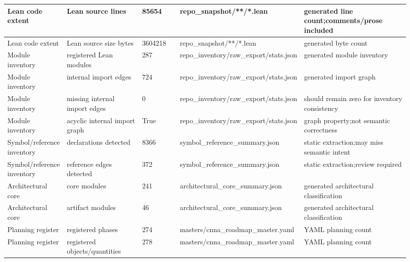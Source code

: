 \begin{longtable}{L{0.13\linewidth} L{0.205\linewidth} L{0.1\linewidth} L{0.235\linewidth} L{0.285\linewidth}}
\hline
\addlinespace[0.24em]
Lean code extent & Lean source lines & 85654 & repo\_snapshot/\allowbreak{}**/\allowbreak{}*.lean & generated line count;\newline comments/\allowbreak{}prose included\\
\hline
\addlinespace[0.24em]
Lean code extent & Lean source size bytes & 3604218 & repo\_snapshot/\allowbreak{}**/\allowbreak{}*.lean & generated byte count\\
\hline
\addlinespace[0.24em]
Module inventory & registered Lean modules & 287 & repo\_inventory/\allowbreak{}raw\_export/\allowbreak{}stats.json & generated module inventory\\
\hline
\addlinespace[0.24em]
Module inventory & internal import edges & 724 & repo\_inventory/\allowbreak{}raw\_export/\allowbreak{}stats.json & generated import graph\\
\hline
\addlinespace[0.24em]
Module inventory & missing internal import edges & 0 & repo\_inventory/\allowbreak{}raw\_export/\allowbreak{}stats.json & should remain zero for inventory consistency\\
\hline
\addlinespace[0.24em]
Module inventory & acyclic internal import graph & True & repo\_inventory/\allowbreak{}raw\_export/\allowbreak{}stats.json & graph property;\newline not semantic correctness\\
\hline
\addlinespace[0.24em]
Symbol/\allowbreak{}reference inventory & declarations detected & 8366 & symbol\_reference\_summary.json & static extraction;\newline may miss semantic intent\\
\hline
\addlinespace[0.24em]
Symbol/\allowbreak{}reference inventory & reference edges detected & 372 & symbol\_reference\_summary.json & static extraction;\newline review required\\
\hline
\addlinespace[0.24em]
Architectural core & core modules & 241 & architectural\_core\_summary.json & generated architectural classification\\
\hline
\addlinespace[0.24em]
Architectural core & artifact modules & 46 & architectural\_core\_summary.json & generated architectural classification\\
\hline
\addlinespace[0.24em]
Planning register & registered phases & 274 & masters/\allowbreak{}cnna\_roadmap\_master.yaml & YAML planning count\\
\hline
\addlinespace[0.24em]
Planning register & registered objects/\allowbreak{}quantities & 278 & masters/\allowbreak{}cnna\_roadmap\_master.yaml & YAML planning count\\

\end{longtable}
